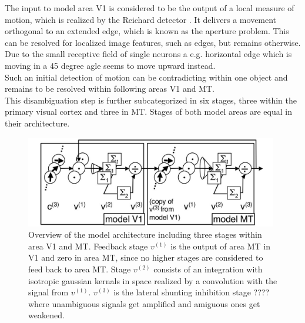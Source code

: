\documentclass[a4paper]{article}
\begin{document}
The input to model area V1 is considered to be the output of a local measure of motion, which is realized by the Reichard detector \cite{Reichard}. It delivers a movement orthogonal to an extended edge, which is known as the aperture problem. This can be resolved for localized image features, such as edges, but remains otherwise. Due to the small receptive field of single neurons a e.g. horizontal edge which is moving in a 45 degree agle seems to move upward instead.\\
Such an initial detection of motion can be contradicting within one object and remains to be resolved within following areas V1 and MT.\\
This disambiguation step is further subcategorized in six stages, three within the primary visual cortex and three in MT. Stages of both model areas are equal in their architecture.\\

\vspace{0.5cm}
\begin{figure}[ht]
\centering
\includegraphics[width=11cm]{bayerl1}
\caption{Overview of the model architecture including three stages within area V1 and MT. Feedback stage $v^{(1)}$ is the output of area MT in V1 and zero in area MT, since no higher stages are considered to feed back to area MT. Stage $v^{(2)}$ consists of an integration with isotropic gaussian kernals in space realized by a convolution with the signal from $v^{(1)}$. $v^{(3)}$ is the lateral shunting inhibition stage ???? where unambiguous signals get amplified and amiguous ones get weakened.}
\label{fig:bayerl1}
\end{figure}
\vspace{0.5cm}
\end{document}
